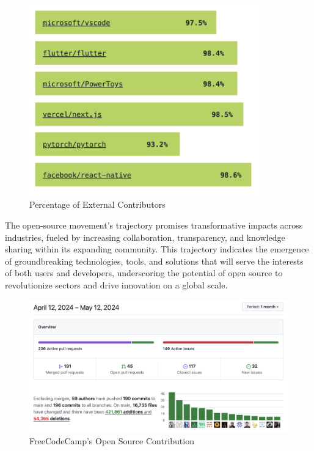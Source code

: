 \begin{figure}[ht]
    \includegraphics[width=10cm]{figs/percent_external_contributors.png}
    \centering
    \caption{Percentage of External Contributors}
    \label{fig:percent_external_contributors}
\end{figure}

The open-source movement's trajectory promises transformative impacts across industries, fueled by increasing collaboration, transparency, and knowledge sharing within its expanding community. This trajectory indicates the emergence of groundbreaking technologies, tools, and solutions that will serve the interests of both users and developers, underscoring the potential of open source to revolutionize sectors and drive innovation on a global scale.


\begin{figure}[ht]
    \includegraphics[width=1\linewidth]{figs/freecodecamp.png}
    \centering
    \caption{FreeCodeCamp's Open Source Contribution}
    \label{fig:freeCodeCamp}
\end{figure}





\clearpage  %
